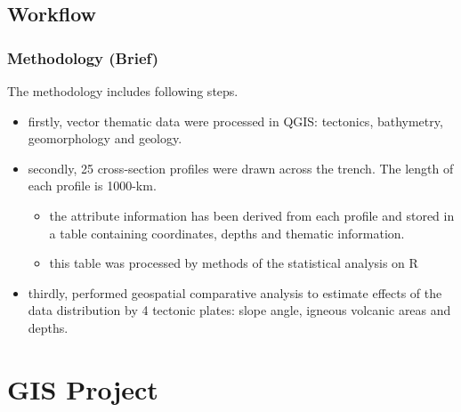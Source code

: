 \documentclass[pdflatex,compress,10pt,
	xcolor={dvipsnames,dvipsnames,svgnames,x11names,table},
	hyperref={colorlinks = true,breaklinks = true, urlcolor = NavyBlue, breaklinks = true}]{beamer}
\begin{document}
\subsection{Workflow}
\begin{frame}
\frametitle{Methodology (Brief)}
The methodology includes following steps. 
\begin{itemize}
    \item<1-> firstly, vector thematic data were processed in QGIS: tectonics, bathymetry, geomorphology and geology.
    \item<2-> secondly, 25 cross-section profiles were drawn across the trench. The length of each profile is 1000-km. 
        \begin{itemize}
            \item the attribute information has been derived from each profile and stored in a table containing coordinates, depths and thematic information.
            \item this table was processed by methods of the statistical analysis on R
        \end{itemize}
      \item<3-> thirdly, performed geospatial comparative analysis to estimate effects of the data distribution by 4 tectonic plates: slope angle, igneous volcanic areas and depths.
\end{itemize}
\end{frame}

\section{GIS Project}
\end{document}
